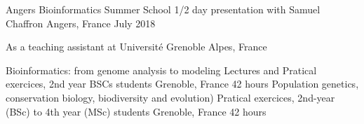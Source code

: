 

\begin{cvhonors}
  \cvhonor
    {Angers Bioinformatics Summer School} %
    {1/2 day presentation with Samuel Chaffron} %
    {Angers, France} %
    {July 2018} %
\end{cvhonors}


\begin{small}
As a teaching assistant at Université Grenoble Alpes, France
\end{small}

\begin{cvhonors}
  \cvhonor
    {Bioinformatics: from genome analysis to modeling} %
    {Lectures and Pratical exercices, 2nd year BSCs students} %
    {Grenoble, France} %
    {42 hours} %
  \cvhonor
    {Population genetics, conservation biology, biodiversity and evolution)} %
    {Pratical exercices, 2nd-year (BSc) to 4th year (MSc) students} %
    {Grenoble, France} %
    {42 hours} %
    
\end{cvhonors}
